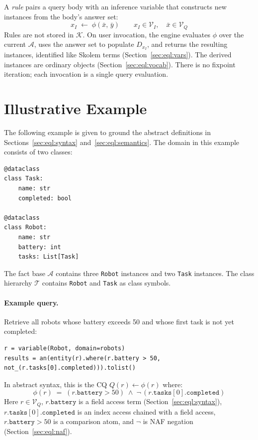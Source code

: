 \documentclass[11pt, a4paper]{article}
\theoremstyle{plain}
\theoremstyle{definition}
\theoremstyle{remark}
\begin{document}
A \emph{rule} pairs a query body with an inference variable that constructs new instances from
the body's answer set:
\[
  x_I \;\leftarrow\; \phi(\bar{x},\,\bar{y})
  \qquad x_I \in \mathcal{V}_I,\quad \bar{x} \in \mathcal{V}_Q
\]
Rules are not stored in $\mathcal{K}$.  On user invocation, the engine evaluates $\phi$ over
the current $\mathcal{A}$, uses the answer set to populate $D_{x_I}$, and returns the
resulting instances, identified like Skolem terms (Section~\ref{sec:eql:vars}).  The derived
instances are ordinary objects (Section~\ref{sec:eql:vocab}).  There is no fixpoint iteration; each
invocation is a single query evaluation.

\section{Illustrative Example}
\label{sec:eql:example}

The following example is given to ground the abstract definitions in Sections~\ref{sec:eql:syntax}
and~\ref{sec:eql:semantics}.  The domain in this example
consists of two classes:

\begin{lstlisting}
@dataclass
class Task:
    name: str
    completed: bool

@dataclass
class Robot:
    name: str
    battery: int
    tasks: List[Task]
\end{lstlisting}

\noindent
The fact base $\mathcal{A}$ contains three \texttt{Robot} instances and two \texttt{Task}
instances.  The class hierarchy $\mathcal{T}$ contains \texttt{Robot} and \texttt{Task} as
class symbols.

\paragraph{Example query.}
Retrieve all robots whose battery exceeds 50 and whose first task is not yet completed:

\begin{lstlisting}
r = variable(Robot, domain=robots)
results = an(entity(r).where(r.battery > 50, not_(r.tasks[0].completed))).tolist()
\end{lstlisting}

\noindent
In abstract syntax, this is the CQ $Q(r) \leftarrow \phi(r)$ where:
\[
  \phi(r) \;=\; (r.\mathtt{battery} > 50)
            \;\wedge\; \neg\,(r.\mathtt{tasks}[0].\mathtt{completed})
\]
Here $r \in \mathcal{V}_Q$, $r.\mathtt{battery}$ is a field access term
(Section~\ref{sec:eql:syntax}), $r.\mathtt{tasks}[0].\mathtt{completed}$ is an index access
chained with a field access, $r.\mathtt{battery} > 50$ is a comparison atom, and $\neg$ is
NAF negation (Section~\ref{sec:eql:naf}).
\end{document}
